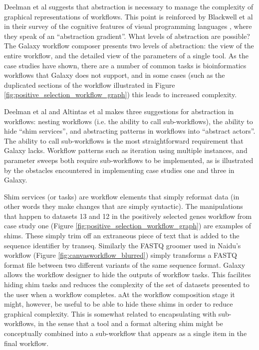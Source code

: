 \documentclass[a4paper,10pt]{scrreprt}
\begin{document}
Deelman et al \cite{deelman_workflows_2009} suggests that abstraction is necessary to manage the complexity of graphical representations of workflows. This point is reinforced by Blackwell et al in their survey of the cognitive features of visual programming languages \cite{blackwell_cognitive_2001}, where they speak of an ``abstraction gradient''. What levels of abstraction are possible? The Galaxy workflow composer presents two levels of abstraction: the view of the entire workflow, and the detailed view of the parameters of a single tool. As the case studies have shown, there are a number of common tasks is bioinformatics workflows that Galaxy does not support, and in some cases (such as the duplicated sections of the workflow illustrated in Figure \ref{fig:positive_selection_workflow_graph}) this leads to increased complexity.

Deelman et al and Altintas et al \cite{altintas_framework_2005} makes three suggestions for abstraction in workflows: nesting workflows (i.e. the ability to call sub-workflows), the ability to hide ``shim services'', and abstracting patterns in workflows into ``abstract actors''. The ability to call sub-workflows is the most straightforward requirement that Galaxy lacks. Workflow patterns such as iteration using multiple instances, and parameter sweeps both require sub-workflows to be implemented, as is illustrated by the obstacles encountered in implementing case studies one and three in Galaxy.

Shim services (or tasks) are workflow elements that simply reformat data (in other words they make changes that are simply syntactic). The manipulations that happen to datasets 13 and 12 in the positively selected genes workflow from case study one (Figure \ref{fig:positive_selection_workflow_graph}) are examples of shims. These simply trim off an extraneous piece of text that is added to the sequence identifier by transeq. Similarly the FASTQ groomer used in Naidu's workflow (Figure \ref{fig:canvasworkflow_blurred}) simply transforms a FASTQ format file between two different variants of the same sequence format. Galaxy allows the workflow designer to hide the outputs of workflow tasks. This facilites hiding shim tasks and reduces the complexity of the set of datasets presented to the user when a workflow completes. aAt the workflow composition stage it might, however, be useful to be able to hide these shims in order to reduce graphical complexity. This is somewhat related to encapsulating with sub-
workflows, in the sense that a tool and a format altering shim might be conceptually combined into a sub-workflow that appears as a single item in the final workflow.
\end{document}
